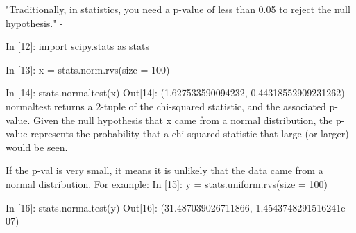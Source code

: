 


"Traditionally, in statistics, you need a p-value of less than 0.05 to reject the null hypothesis." - 


In [12]: import scipy.stats as stats

In [13]: x = stats.norm.rvs(size = 100)

In [14]: stats.normaltest(x)
Out[14]: (1.627533590094232, 0.44318552909231262)
normaltest returns a 2-tuple of the chi-squared statistic, and the associated p-value. Given the null hypothesis that x came from a normal distribution, the p-value represents the probability that a chi-squared statistic that large (or larger) would be seen.

If the p-val is very small, it means it is unlikely that the data came from a normal distribution. For example:
In [15]: y = stats.uniform.rvs(size = 100)

In [16]: stats.normaltest(y)
Out[16]: (31.487039026711866, 1.4543748291516241e-07)
